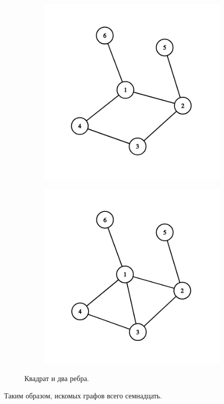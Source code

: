 \begin{solution}
\begin{figure}[H]
  \centering
  \begin{subfigure}[a]{0.24\linewidth}
    \includegraphics[width=\linewidth]{_img/344/16.png}
  \end{subfigure}
  \begin{subfigure}[a]{0.24\linewidth}
    \includegraphics[width=\linewidth]{_img/344/17.png}
  \end{subfigure}
  \caption{Квадрат и два ребра.}
\end{figure}

Таким образом, искомых графов всего семнадцать.
\end{solution}